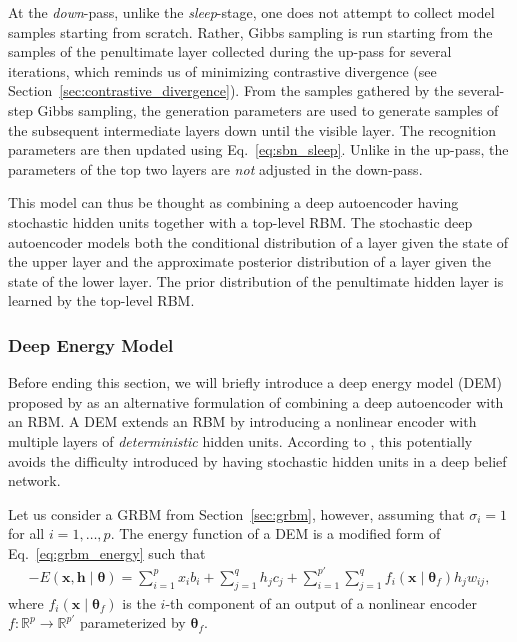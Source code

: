 \documentclass[dissertation,nocontribution,draft*]{aaltoseries}
\newcommand{\vect}[1]{\mathbf{#1}}
\newcommand{\vects}[1]{\boldsymbol{#1}}
\newcommand{\vh}[0]{\vect{h}}
\newcommand{\vx}[0]{\vect{x}}
\newcommand{\TT}[0]{{\vects{\theta}}}
\newcommand{\RR}[0]{\mathbb{R}}
\begin{document}
At the \textit{down}-pass, unlike the \textit{sleep}-stage,
one does not attempt to collect model samples starting from
scratch. Rather, Gibbs sampling is run starting from the
samples of the penultimate layer collected during the
up-pass for several iterations, which reminds us of
minimizing contrastive divergence (see
Section~\ref{sec:contrastive_divergence}). From the samples
gathered by the several-step Gibbs sampling, the generation
parameters are used to generate samples of the subsequent
intermediate layers down until the visible layer. The
recognition parameters are then updated using
Eq.~\eqref{eq:sbn_sleep}. Unlike in the up-pass, the
parameters of the top two layers are \textit{not} adjusted
in the down-pass.

This model can thus be thought as combining a deep
autoencoder having stochastic hidden units together with a
top-level RBM. The stochastic deep autoencoder models both
the conditional distribution of a layer given the state of
the upper layer and the approximate posterior distribution
of a layer given the state of the lower layer. The prior
distribution of the penultimate hidden layer is learned by
the top-level RBM.

\subsubsection{Deep Energy Model}

Before ending this section, we will briefly introduce a deep
energy model (DEM)
proposed by \citet{Ngiam2011} as an alternative formulation
of combining a deep autoencoder with an RBM. A DEM extends
an RBM by introducing a nonlinear encoder with multiple
layers of \textit{deterministic} hidden units. According to
\citet{Ngiam2011}, this potentially avoids the difficulty
introduced by having stochastic hidden units in a deep
belief network.

Let us consider a GRBM from Section~\ref{sec:grbm}, however,
assuming that $\sigma_i=1$ for all $i=1,\dots,p$. The energy
function of a DEM is a modified form of
Eq.~\eqref{eq:grbm_energy} such that
\begin{align*}
    \label{eq:dem_energy}
    -E(\vx, \vh \mid \TT) = \sum_{i=1}^p x_i b_i
    + \sum_{j=1}^q h_j c_j +
    \sum_{i=1}^{p'} \sum_{j=1}^q f_i(\vx\mid \TT_f) h_j
    w_{ij},
\end{align*}
where $f_i(\vx \mid \TT_f)$ is the $i$-th component of an
output of a nonlinear encoder $f:\RR^p \to \RR^{p'}$
parameterized by $\TT_f$.
\end{document}
